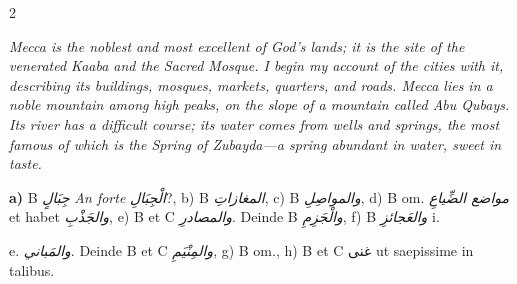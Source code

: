 \documentclass[11pt,a4paper]{article}
\newcommand{\ar}[1]{{\arabicfont\beginR #1\endR}}
\begin{document}
\begin{paracol}{2}

\switchcolumn[0]
\begin{flushright}
{\small\arabicfont
{}}
\end{flushright}

\switchcolumn[1]
\begin{flushleft}
\small
\textit{Mecca is the noblest and most excellent of God's lands; it is the site of the venerated Kaaba and the Sacred Mosque. I begin my account of the cities with it, describing its buildings, mosques, markets, quarters, and roads. Mecca lies in a noble mountain among high peaks, on the slope of a mountain called Abu Qubays. Its river has a difficult course; its water comes from wells and springs, the most famous of which is the Spring of Zubayda---a spring abundant in water, sweet in taste.}
\end{flushleft}

\end{paracol}

\vspace{0.3cm}

\begin{footnotesize}
\noindent\textbf{a)} B \textit{\ar{جِبَالٍ}} \textit{An forte} \textit{\ar{الْجِبَالِ}}?, b) B \textit{\ar{المغازاتِ}}, c) B \textit{\ar{والمواصِلِ}}, d) B om. \textit{\ar{مواضع الضِّياعِ}} et habet \textit{\ar{والجَذْبِ}}, e) B et C \textit{\ar{والمصادرِ}}. Deinde B \textit{\ar{والْجَزِمِ}}, f) B \textit{\ar{والعَجائزِ}} i.

e. \textit{\ar{والمَباني}}. Deinde B et C \textit{\ar{والمِنْيَمِ}}, g) B om., h) B et C غنى ut saepissime in talibus.
\end{footnotesize}

\clearpage

\end{document}
